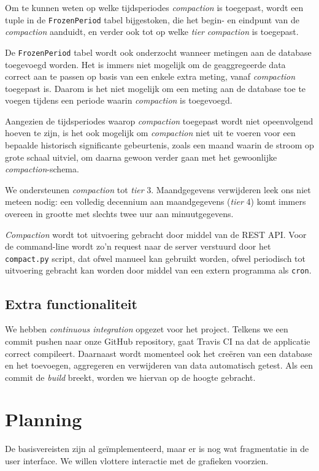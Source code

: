 \documentclass[12pt,draft,parskip=full]{article}
\begin{document}
Om te kunnen weten op welke tijdsperiodes \emph{compaction} is toegepast, wordt een tuple in de \texttt{FrozenPeriod} tabel bijgestoken, die het begin- en eindpunt van de \emph{compaction} aanduidt, en verder ook tot op welke \emph{tier} \emph{compaction} is toegepast. 

De \texttt{FrozenPeriod} tabel wordt ook onderzocht wanneer metingen aan de database toegevoegd worden. Het is immers niet mogelijk om de geaggregeerde data correct aan te passen op basis van een enkele extra meting, vanaf \emph{compaction} toegepast is. Daarom is het niet mogelijk om een meting aan de database toe te voegen tijdens een periode waarin \emph{compaction} is toegevoegd.

Aangezien de tijdsperiodes waarop \emph{compaction} toegepast wordt niet opeenvolgend hoeven te zijn, is het ook mogelijk om \emph{compaction} niet uit te voeren voor een bepaalde historisch significante gebeurtenis, zoals een maand waarin de stroom op grote schaal uitviel, om daarna gewoon verder gaan met het gewoonlijke \emph{compaction}-schema.

We ondersteunen \emph{compaction} tot \emph{tier} 3. Maandgegevens verwijderen leek ons niet meteen nodig: een volledig decennium aan maandgegevens (\emph{tier} 4) komt immers overeen in grootte met slechts twee uur aan minuutgegevens.

\emph{Compaction} wordt tot uitvoering gebracht door middel van de REST API. Voor de command-line wordt zo'n request naar de server verstuurd door het \texttt{compact.py} script, dat ofwel manueel kan gebruikt worden, ofwel periodisch tot uitvoering gebracht kan worden door middel van een extern programma als \texttt{cron}.

\subsection{Extra functionaliteit}

We hebben
\emph{continuous integration} opgezet voor het project. Telkens we een {commit} 
pushen naar onze GitHub {repository}, gaat Travis CI na dat de applicatie 
correct compileert. Daarnaast wordt 
momenteel ook het cre\"eren van een database en het toevoegen, aggregeren en 
verwijderen van data automatisch getest. Als een commit de \textit{build} 
breekt, worden we hiervan op de hoogte gebracht.

\section{Planning}
De basisvereisten zijn al ge\"implementeerd, maar er is nog wat fragmentatie in
de user interface. We willen vlottere interactie met de grafieken voorzien.
\end{document}
